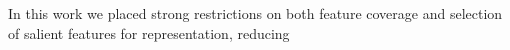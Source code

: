 \documentclass[11pt]{article}
\begin{document}
In this work we placed strong restrictions on both feature coverage and selection of salient features for representation, reducing 
%




\end{document}
